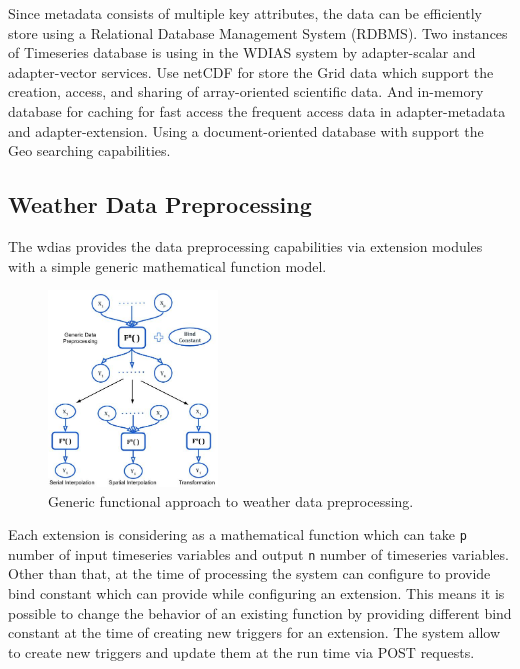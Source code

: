 \documentclass[conference]{IEEEtran}
\begin{document}
Since metadata consists of multiple key attributes, the data can be efficiently store using a Relational Database Management System (RDBMS). Two instances of Timeseries database is using in the WDIAS system by adapter-scalar and adapter-vector services. Use \acrfull{netCDF} for store the Grid data which support the creation, access, and sharing of array-oriented scientific data. And  in-memory database for caching for fast access the frequent access data in adapter-metadata and adapter-extension. Using a document-oriented database with support the Geo searching capabilities.

\subsection{Weather Data Preprocessing}
\label{psubse:data_preprocessing}

The \acrshort{wdias} provides the data preprocessing capabilities via extension modules with a simple generic mathematical function model.

\begin{figure}[htbp]
\centerline{\includegraphics[width=0.4\textwidth]{method/data_preprocess/summary_weather_data_preprocessing.jpg}}
\caption{Generic functional approach to weather data preprocessing.}
\label{pfi:summary_weather_data_preprocessing}
\end{figure}

Each extension is considering as a mathematical function which can take \texttt{p} number of input timeseries variables and output \texttt{n} number of timeseries variables. Other than that, at the time of processing the system can configure to provide bind constant which can provide while configuring an extension. This means it is possible to change the behavior of an existing function by providing different bind constant at the time of creating new triggers for an extension. The system allow to create new triggers and update them at the run time via POST requests.
\end{document}
